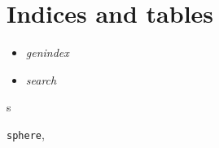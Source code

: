 \documentclass[letterpaper,10pt,english]{sphinxmanual}
\begin{document}
\chapter{Indices and tables}
\label{index:indices-and-tables}\begin{itemize}
\item {} 
\emph{genindex}

\item {} 
\emph{search}

\end{itemize}


\renewcommand{\indexname}{Python Module Index}
\begin{theindex}
\def\bigletter#1{{\Large\sffamily#1}\nopagebreak\vspace{1mm}}
\bigletter{s}
\item {\texttt{sphere}}, \pageref{python_api:module-sphere}
\end{theindex}

\renewcommand{\indexname}{Index}
\printindex
\end{document}

